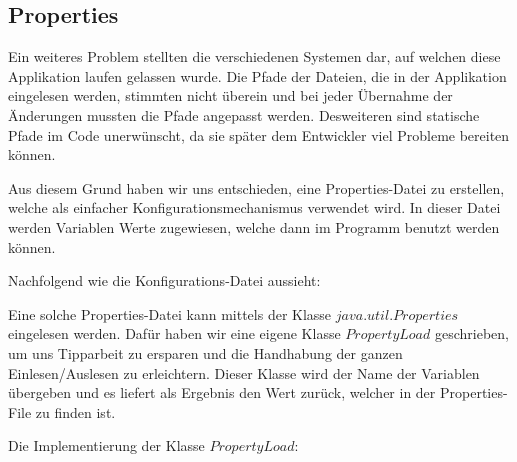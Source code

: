 \subsection{Properties}
Ein weiteres Problem stellten die verschiedenen Systemen dar, auf welchen diese Applikation laufen gelassen wurde. Die Pfade der Dateien, die in der Applikation eingelesen werden, stimmten nicht überein und bei jeder Übernahme der Änderungen mussten die Pfade angepasst werden. Desweiteren sind statische Pfade im Code unerwünscht, da sie später dem Entwickler viel Probleme bereiten können. 

Aus diesem Grund haben wir uns entschieden, eine Properties-Datei zu erstellen, welche als einfacher Konfigurationsmechanismus verwendet wird. In dieser Datei werden Variablen Werte zugewiesen, welche dann im Programm benutzt werden können. 

Nachfolgend wie die Konfigurations-Datei aussieht:


Eine solche Properties-Datei kann mittels der Klasse $java.util.Properties$ eingelesen werden. Dafür haben wir eine eigene Klasse $PropertyLoad$ geschrieben, um uns Tipparbeit zu ersparen und die Handhabung der ganzen Einlesen/Auslesen zu erleichtern. Dieser Klasse wird der Name der Variablen übergeben und es liefert als Ergebnis den Wert zurück, welcher in der Properties-File zu finden ist.

Die Implementierung der Klasse $PropertyLoad$:


